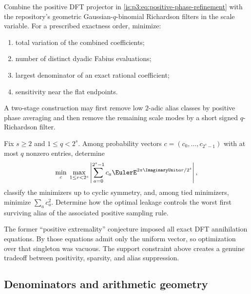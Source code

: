 \begin{problem}
\label{is:p3:prob:hybrid-filter}
Combine the positive DFT projector in \eqref{is:p3:eq:positive-phase-refinement} with the repository's geometric Gaussian-$q$-binomial Richardson filters in the scale variable.  For a prescribed exactness order, minimize:
\begin{enumerate}
\item total variation of the combined coefficients;
\item number of distinct dyadic Fabius evaluations;
\item largest denominator of an exact rational coefficient;
\item sensitivity near the flat endpoints.
\end{enumerate}
A two-stage construction may first remove low $2$-adic alias classes by positive phase averaging and then remove the remaining scale modes by a short signed $q$-Richardson filter.
\end{problem}

\begin{problem}
\label{is:p3:prob:sparse-positive-phase}
Fix $s\ge2$ and $1\le q<2^s$.  Among probability vectors
$c=(c_0,\ldots,c_{2^s-1})$ with at most $q$ nonzero entries, determine
\[
 \min_c\;\max_{1\le r<2^s}
 \left|\sum_{a=0}^{2^s-1}c_a
       \EulerE^{2\pi\ImaginaryUnit ar/2^s}\right|,
\]
classify the minimizers up to cyclic symmetry, and, among tied minimizers,
minimize $\sum_ac_a^2$.  Determine how the optimal leakage controls the
worst first surviving alias of the associated positive sampling rule.
\end{problem}

The former ``positive extremality'' conjecture imposed all exact DFT
annihilation equations.  By  those
equations admit only the uniform vector, so optimization over that singleton
was vacuous.  The support constraint above creates a genuine tradeoff between
positivity, sparsity, and alias suppression.

\subsection{Denominators and arithmetic geometry}

